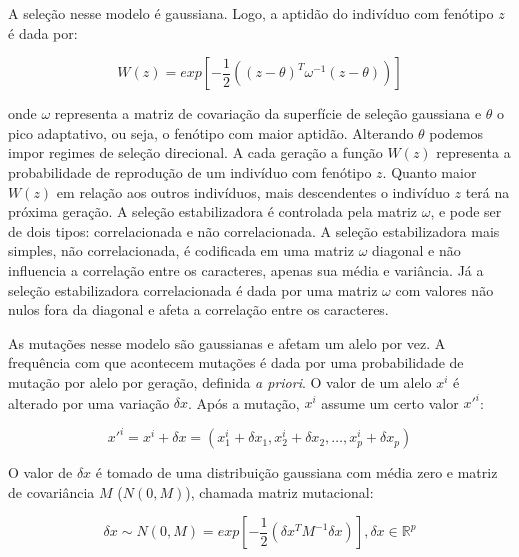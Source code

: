 A seleção nesse modelo é gaussiana.
Logo, a aptidão do indivíduo com fenótipo $z$ é dada por:

\begin{equation}
W(z) = exp \left[-\frac{1}{2} ((z-\theta)^T \omega^{-1} (z-\theta))\right] 
\label{selecao}
\end{equation}

onde $\omega$ representa a matriz de covariação da superfície de seleção
gaussiana e $\theta$ o pico adaptativo, ou seja, o fenótipo com maior
aptidão.
Alterando $\theta$ podemos impor regimes de seleção direcional.
A cada geração a função $W(z)$ representa a probabilidade de reprodução
de um indivíduo com fenótipo $z$.
Quanto maior $W(z)$ em relação aos outros indivíduos, mais descendentes
o indivíduo $z$ terá na próxima geração.
A seleção estabilizadora é controlada pela matriz $\omega$, e
pode ser de dois tipos: correlacionada e não correlacionada.
A seleção estabilizadora mais simples, não correlacionada, é codificada
em uma matriz $\omega$ diagonal e não influencia a correlação entre os
caracteres, apenas sua média e variância.
Já a seleção estabilizadora correlacionada é dada por uma matriz
$\omega$ com valores não nulos fora da diagonal e afeta a correlação
entre os caracteres.

As mutações nesse modelo são gaussianas e afetam um alelo por vez.
A frequência com que acontecem mutações é dada por uma probabilidade de
mutação por alelo por geração, definida {\it a priori}.
O valor de um alelo $x^i$ é alterado por uma variação $ \delta x$.
Após a mutação, $x^i$ assume um certo valor $x'^i$:

\begin{equation}
x'^i = x^i + \delta x = ( x^i_1 + \delta x_1, x^i_2 + \delta x_2,\ldots, x^i_p + \delta x_p)
\end{equation}

O valor de $\delta x$ é tomado de uma distribuição gaussiana com média
zero e matriz de covariância $M$ ($N(0, M)$), chamada matriz mutacional:

\begin{equation}
\delta x \sim N(0, M) = exp \left[-\frac{1}{2} (\delta x^T M^{-1} \delta x)\right] , \delta x \in \mathbb{R}^p
\end{equation}

